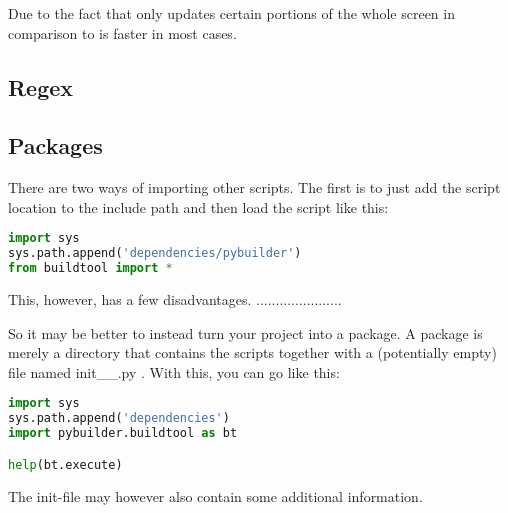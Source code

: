 Due to the fact that  only updates certain portions of the whole screen in comparison to  is faster in most cases.


\subsection{Regex}



\subsection{Packages}
There are two ways of importing other scripts. The first is to just add the script location to the include path and then load the script like this: 

\begin{lstlisting}[language=python]
import sys
sys.path.append('dependencies/pybuilder')
from buildtool import *
\end{lstlisting}

This, however, has a few disadvantages. ......................

So it may be better to instead turn your project into a package. A package is merely a directory that contains the scripts together with a (potentially empty) file named \verb __init__.py . With this, you can go like this:
\begin{lstlisting}[language=python]
import sys
sys.path.append('dependencies')
import pybuilder.buildtool as bt

help(bt.execute)
\end{lstlisting}

The init-file may however also contain some additional information. 
